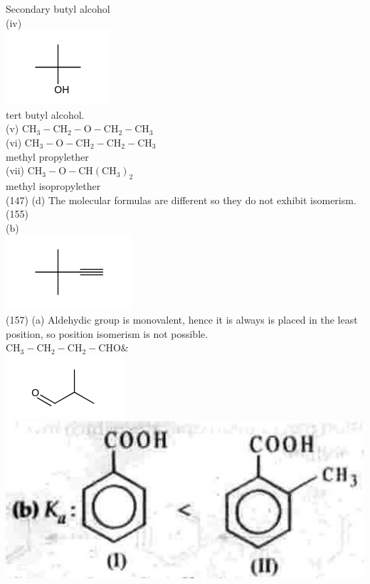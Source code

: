 \documentclass[10pt]{article}
\begin{document}
Secondary butyl alcohol\\
(iv)\\
\includegraphics{smile-aed70079e683a66ea7feb649639aa8a535017dd3}\\
tert butyl alcohol.\\
(v) $\mathrm{CH}_{3}-\mathrm{CH}_{2}-\mathrm{O}-\mathrm{CH}_{2}-\mathrm{CH}_{3}$\\
(vi) $\mathrm{CH}_{3}-\mathrm{O}-\mathrm{CH}_{2}-\mathrm{CH}_{2}-\mathrm{CH}_{3}$\\
methyl propylether\\
(vii) $\mathrm{CH}_{3}-\mathrm{O}-\mathrm{CH}\left(\mathrm{CH}_{3}\right)_{2}$\\
methyl isopropylether\\
(147) (d) The molecular formulas are different so they do not exhibit isomerism.\\
(155)\\
(b)\\
\includegraphics{smile-f0c5bc64fb7f9763fdf03a985fc93b1fa930053f}\\
(157) (a) Aldehydic group is monovalent, hence it is always is placed in the least position, so position isomerism is not possible.\\
$\mathrm{CH}_{3}-\mathrm{CH}_{2}-\mathrm{CH}_{2}-\mathrm{CHO} \&$\\
\includegraphics{smile-a3bbdb550b8071045af3f0409e4cdde390d5d569}\\
\includegraphics[max width=\textwidth, center]{2025_01_28_8470952b98110cec3aabg-163(4)}\\
\end{document}
